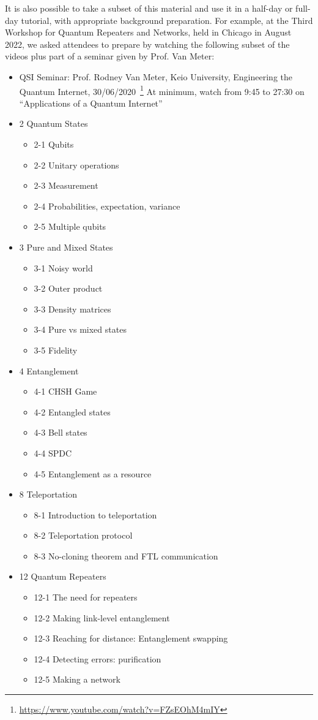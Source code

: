 It is also possible to take a subset of this material and use it in a half-day or full-day tutorial, with appropriate background preparation.  For example, at the Third Workshop for Quantum Repeaters and Networks, held in Chicago in August 2022, we asked attendees to prepare by watching the following subset of the videos plus part of a seminar given by Prof. Van Meter:
\begin{itemize}
\item QSI Seminar: Prof. Rodney Van Meter, Keio University, Engineering the Quantum Internet, 30/06/2020~\footnote{\url{https://www.youtube.com/watch?v=FZsEOhM4mIY}}
At minimum, watch from 9:45 to 27:30 on 
“Applications of a Quantum Internet”
\item 2 Quantum States
\begin{itemize}
\item 2-1 Qubits
\item 2-2 Unitary operations				
\item 2-3 Measurement
\item 2-4 Probabilities, expectation, variance
\item 2-5 Multiple qubits
\end{itemize}
\item 3 Pure and Mixed States
\begin{itemize}
\item 3-1 Noisy world
\item 3-2 Outer product
\item 3-3 Density matrices
\item 3-4 Pure vs mixed states
\item 3-5 Fidelity
\end{itemize}
\item 4 Entanglement
\begin{itemize}
\item 4-1 CHSH Game
\item 4-2 Entangled states
\item 4-3 Bell states
\item 4-4 SPDC
\item 4-5 Entanglement as a resource
\end{itemize}
\item 8 Teleportation
\begin{itemize}
\item 8-1 Introduction to teleportation
\item 8-2 Teleportation protocol
\item 8-3 No-cloning theorem and FTL communication
\end{itemize}
\item 12 Quantum Repeaters
\begin{itemize}
\item 12-1 The need for repeaters
\item 12-2 Making link-level entanglement
\item 12-3 Reaching for distance: Entanglement swapping
\item 12-4 Detecting errors: purification
\item 12-5 Making a network 
\end{itemize}
\end{itemize}

